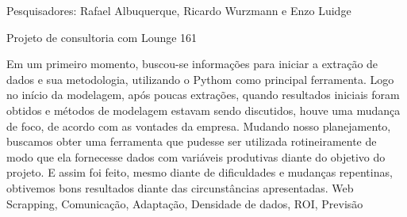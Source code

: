\documentclass[
    10pt, 
    a4paper, 
    ]{article}
\begin{document}


    {\noindent Pesquisadores:  Rafael Albuquerque, Ricardo Wurzmann e Enzo Luidge
    
    \noindent Projeto de consultoria com Lounge 161
    }
    {Em um primeiro momento, buscou-se informações para iniciar a extração de dados e sua metodologia, utilizando o Pythom como principal ferramenta. Logo no início da modelagem, após poucas extrações, quando resultados iniciais foram obtidos e métodos de modelagem estavam sendo discutidos, houve uma mudança de foco, de acordo com as vontades da empresa. Mudando nosso planejamento, buscamos obter uma ferramenta 
    que pudesse ser utilizada rotineiramente de modo que ela fornecesse dados com variáveis produtivas diante do objetivo do projeto. E assim foi feito, mesmo diante de dificuldades e mudanças repentinas, obtivemos bons resultados diante das circunstâncias apresentadas.}
    {Web Scrapping, Comunicação, Adaptação, Densidade de dados, ROI, Previsão
    }




\clearpage

\nocite{*}

\printbibliography

\appendix
\end{document}

